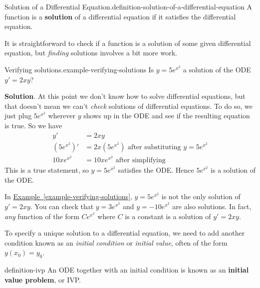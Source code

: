 \documentclass[10pt,]{book}
\newcommand{\terminology}[1]{\textbf{#1}}
\numberwithin{equation}{section}
\begin{document}
\begin{definition}{Solution of a Differential Equation.}{definition-solution-of-a-differential-equation}%
\hypertarget{p-722}{}%
A function is a \terminology{solution} of a differential equation if it satisfies the differential equation.%
\end{definition}
\hypertarget{p-723}{}%
It is straightforward to check if a function is a solution of some given differential equation, but \emph{finding} solutions involves a bit more work.%
\begin{example}{Verifying solutions.}{example-verifying-solutions}%
\hypertarget{p-724}{}%
Is \(y = 5e^{x^{2}}\) a solution of the ODE \(y' = 2xy\)?%
\par\smallskip%
\noindent\textbf{Solution}.\hypertarget{solution-153}{}\quad%
\hypertarget{p-725}{}%
At this point we don't know how to solve differential equations, but that doesn't mean we can't \emph{check} solutions of differential equations. To do so, we just plug \(5e^{x^{2}}\) wherever \(y\) shows up in the ODE and see if the resulting equation is true. So we have%
\begin{align*}
y' & = 2xy \\
(5e^{x^{2}})' & = 2x(5e^{x^{2}}) \text{ after substituting }y = 5e^{x^{2}}\\
10xe^{x^{2}} & = 10xe^{x^{2}} \text{ after simplifying} 
\end{align*}
This is a true statement, so \(y = 5e^{x^{2}}\) satisfies the ODE. Hence \(5e^{x^{2}}\) is a solution of the ODE.%
\end{example}
\hypertarget{p-726}{}%
In \hyperref[example-verifying-solutions]{Example~\ref{example-verifying-solutions}}, \(y = 5e^{x^{2}}\) is not the only solution of \(y' = 2xy\). You can check that \(y = 3e^{x^{2}}\) and \(y = -10e^{x^{2}}\) are also solutions. In fact, \emph{any} function of the form \(Ce^{x^{2}}\) where \(C\) is a constant is a solution of \(y' = 2xy\).%
\par
\hypertarget{p-727}{}%
To specify a unique solution to a differential equation, we need to add another condition known as an \emph{initial condition} or \emph{initial value}, often of the form \(y(x_{0}) = y_{0}\).%
\begin{definition}{}{definition-ivp}%
\hypertarget{p-728}{}%
An ODE together with an initial condition is known as an \terminology{initial value problem}, or IVP.%
\end{definition}
%
%
\typeout{************************************************}
\typeout{************************************************}
%
\end{document}
